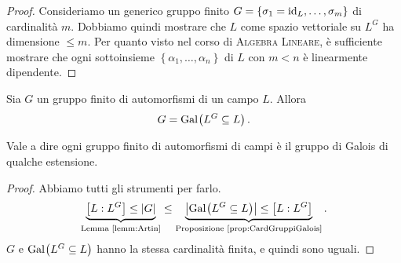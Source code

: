 \begin{proof}
Consideriamo un generico gruppo finito \(G=\{\sigma_1=\mathrm{id}_L,\dots,\sigma_m\}\) di cardinalità \(m\). Dobbiamo quindi mostrare che \(L\) come spazio vettoriale su \(L^G\) ha dimensione \(\le m\). Per quanto visto nel corso di {\scshape Algebra Lineare}, è sufficiente mostrare che ogni sottoinsieme \(\left\{\alpha_1,\dots,\alpha_n\right\}\) di \(L\) con \(m < n\) è linearmente dipendente.
%
%
%
%
%
\end{proof}

\begin{prop}
Sia \(G\) un gruppo finito di automorfismi di un campo \(L\). Allora
\[G = \operatorname{Gal}_{}\!\left(L^G \subseteq L\right) .\]
\end{prop}

Vale a dire ogni gruppo finito di automorfismi di campi è il gruppo di Galois di qualche estensione.

\begin{proof}
Abbiamo tutti gli strumenti per farlo.
\[\underbrace{\left[L:L^G\right] \le \card G}_{\text{Lemma~\ref{lemm:Artin}}} \le \underbrace{\card{\Gal{L^G \subseteq L}} \le \left[L:L^G\right]}_{\text{Proposizione~\ref{prop:CardGruppiGalois}}}.\]
\(G\) e \(\operatorname{Gal}_{}\!\left(L^G \subseteq L\right)\) hanno la stessa cardinalità finita, e quindi sono uguali. 
\end{proof}


